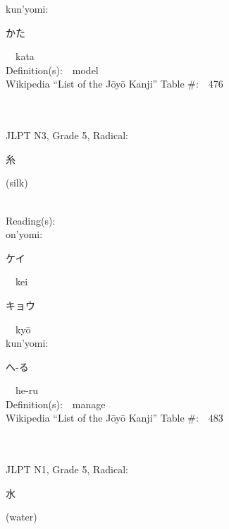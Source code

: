 \begin{multicols}{2}
{\hspace*{1em}}kun'yomi:\ \ \\
{\hspace*{2em}}{\begin{CJK}{UTF8}{min} かた \end{CJK}}\ \ kata\ \ \\
Definition(s):\ \ model \\
Wikipedia ``List of the J\=oy\=o Kanji'' Table \#:\ \ 476 \\
\ \ \\
{\fontsize{34pt}{40pt}  }\ \ \\  %
{JLPT N3, Grade 5, Radical:\ \ {\begin{CJK}{UTF8}{min} 糸 \end{CJK}} (silk) } \\
Reading(s):\ \ \\
{\hspace*{1em}}on'yomi:\ \ \\
{\hspace*{2em}}{\begin{CJK}{UTF8}{min} ケイ \end{CJK}}\ \ kei\ \ \\
{\hspace*{2em}}{\begin{CJK}{UTF8}{min} キョウ \end{CJK}}\ \ ky\=o\ \ \\
{\hspace*{1em}}kun'yomi:\ \ \\
{\hspace*{2em}}{\begin{CJK}{UTF8}{min} へ-る \end{CJK}}\ \ he-ru\ \ \\
Definition(s):\ \ manage \\
Wikipedia ``List of the J\=oy\=o Kanji'' Table \#:\ \ 483 \\
\ \ \\
{\fontsize{34pt}{40pt}  }\ \ \\  %
{JLPT N1, Grade 5, Radical:\ \ {\begin{CJK}{UTF8}{min} 水 \end{CJK}} (water) } \\

\end{multicols}
